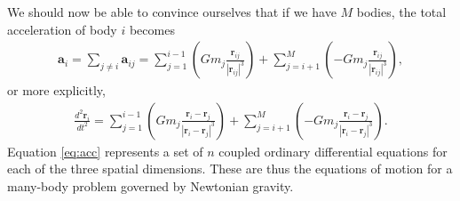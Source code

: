 \documentclass{article}
\newcommand{\lrp}[1]{\left(#1\right)}
\newcommand{\mb}[1]{\mathbf{#1}}
\begin{document}
We should now be able to convince ourselves that if we have $M$ bodies, the total acceleration of body $i$ becomes
\begin{align*}
    \mb{a}_i = \sum_{j \neq i} \mb{a}_{ij} = \sum_{j=1}^{i-1}\lrp{G m_j\frac{\mb{r}_{ij}}{{|\mb{r}_{ij}|}^3}} + \sum_{j=i+1}^M\lrp{-G m_j\frac{\mb{r}_{ij}}{{|\mb{r}_{ij}|}^3}},
\end{align*}
or more explicitly,
\begin{align}
    \frac{d^2\mb{r}_i}{dt^2} = \sum_{j=1}^{i-1}\lrp{G m_j\frac{\mb{r}_i - \mb{r}_j}{{|\mb{r}_i - \mb{r}_j|}^3}} + \sum_{j=i+1}^M\lrp{-G m_j\frac{\mb{r}_i - \mb{r}_j}{{|\mb{r}_i - \mb{r}_j|}^3}}. \label{eq:acc}
\end{align}
Equation \eqref{eq:acc} represents a set of $n$ coupled ordinary differential equations for each of the three spatial dimensions. These are thus the equations of motion for a many-body problem governed by Newtonian gravity.
\end{document}
